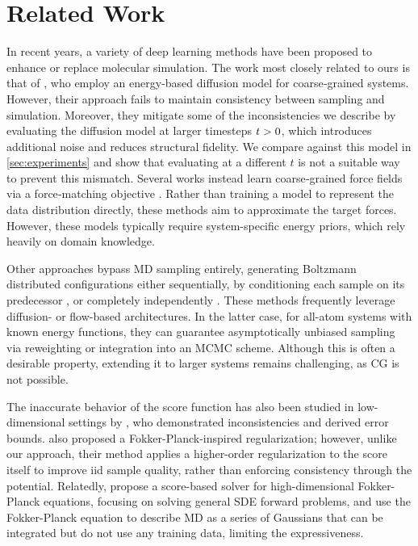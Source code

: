 \section{Related Work}
In recent years, a variety of deep learning methods have been proposed to enhance or replace molecular simulation. The work most closely related to ours is that of \citet{arts2023}, who employ an energy-based diffusion model for coarse‑grained systems. However, their approach fails to maintain consistency between sampling and simulation. Moreover, they mitigate some of the inconsistencies we describe by evaluating the diffusion model at larger timesteps ${t} > 0$, which introduces additional noise and reduces structural fidelity. We compare against this model in \cref{sec:experiments} and show that evaluating at a different $t$ is not a suitable way to prevent this mismatch. Several works instead learn coarse‑grained force fields via a force‑matching objective \citep{husic2020coarse,kohler2023flow,charron2023navigating,durumeric2024learning}. Rather than training a model to represent the data distribution directly, these methods aim to approximate the target forces. However, these models typically require system-specific energy priors, which rely heavily on domain knowledge. 

Other approaches bypass MD sampling entirely, generating Boltzmann distributed configurations either sequentially, by conditioning each sample on its predecessor \citep{dibak2021temperature, plainer2023transition, schreiner2023implicit, tamagnone2024coarse}, or completely independently \citep{noe2019boltzmann, wirnsberger2020targeted, kohler2020equivariant, midgley2022flow, klein2023equivariant,abdin2023pepflow, kim2024scalableNormFlows, wu2024reaction, schebek2024efficient, diez2024generation, tan2025scalable}. These methods frequently leverage diffusion- or flow-based architectures. In the latter case, for all-atom systems with known energy functions, they can guarantee asymptotically unbiased sampling via reweighting or integration into an MCMC scheme. Although this is often a desirable property, extending it to larger systems remains challenging, as \gls{CG} is not possible.

The inaccurate behavior of the score function has also been studied in low-dimensional settings by \cite{koehler2023statistical, li2023generalization}, who demonstrated inconsistencies and derived error bounds. \cite{lai2023} also proposed a Fokker-Planck-inspired regularization; however, unlike our approach, their method applies a higher-order regularization to the score itself to improve iid sample quality, rather than enforcing consistency through the potential. Relatedly, \citet{hu2024scorebased} propose a score-based solver for high-dimensional Fokker-Planck equations, focusing on solving general SDE forward problems, and \citep{du2024doob} use the Fokker-Planck equation to describe \gls{MD} as a series of Gaussians that can be integrated but do not use any training data, limiting the expressiveness. 
